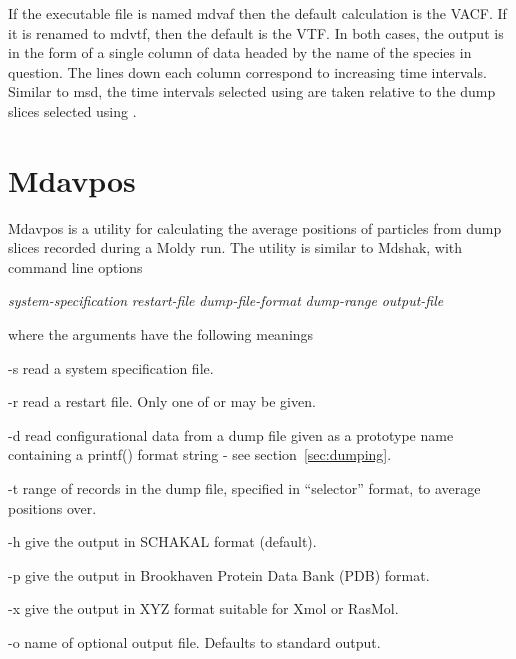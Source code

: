 \documentclass[a4paper,twoside]{report}
\begin{document}
If the executable file is named mdvaf then the default calculation 
is the VACF. If it is renamed to mdvtf, then the default is the 
VTF. In both cases, the output is in the form of a single column 
of data headed by the name of the species in question. The lines 
down each column correspond to increasing time intervals. Similar 
to msd, the time intervals selected using  are taken relative 
to the dump slices selected using . 

\section{Mdavpos}%

Mdavpos is a utility for calculating the average positions of particles
from dump slices recorded during a Moldy run. The utility is similar to
Mdshak, with command line options

\begin{center}
\Lit{[-s} \textit{system-specification}\Lit{]}
\Lit{[-r} \textit{restart-file}\Lit{]}
\Lit{[-d} \textit{dump-file-format}\Lit{]}
\Lit{[-t} \textit{dump-range}\Lit{]} 
\Lit{[-h]}
\Lit{[-p]}
\Lit{[-x]}
\Lit{[-o} \textit{output-file}\Lit{]}
\end{center}

where the arguments have the following meanings

\begin{Argdescription}
\item[-s] read a system specification file.
\item[-r] read a restart file. Only one of  or  may be given.
\item[-d] read configurational data from a dump file given as a prototype name
containing a printf() format string - see section~\ref{sec:dumping}.
\item[-t] range of records in the dump file, specified in ``selector'' format, to
average positions over.
\item[-h] give the output in SCHAKAL format (default).
\item[-p] give the output in Brookhaven Protein Data Bank (PDB) format.
\item[-x] give the output in XYZ format suitable for Xmol or RasMol.
\item[-o] name of optional output file. Defaults to standard output.
\end{Argdescription}
\end{document}
